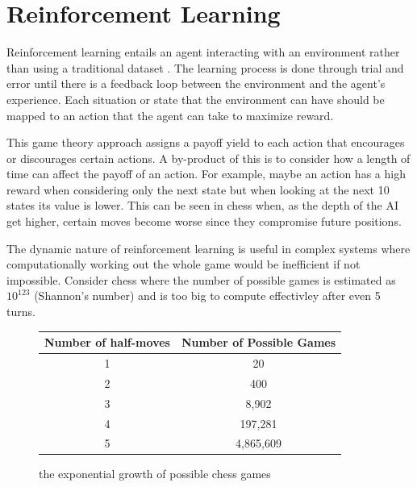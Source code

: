 \documentclass[10pt,a4paper]{report}
\begin{document}
	\chapter{Reinforcement Learning}
		Reinforcement learning entails an agent interacting with an environment rather than using a traditional dataset \autocite[p. 105]{DeepLearning}.
		The learning process is done through trial and error until there is a feedback loop between the environment and the agent's experience. Each situation
		or state that the environment can have should be mapped to an action that the agent can take to maximize reward. \par
		This game theory approach assigns a payoff yield to each action that encourages or discourages certain actions.
		A by-product of this is to consider how a length of time can affect the payoff of an action. For example, maybe an action has
		a high reward when considering only the next state but when looking at the next 10 states its value is lower. This can be seen
		in chess when, as the depth of the AI get higher, certain moves become worse since they compromise future positions. \par
		The dynamic nature of reinforcement learning is useful in complex systems where computationally working out the whole game would be inefficient if not impossible.
		Consider chess \autocite{shannon1950xxii} where the number of possible games is estimated as $10^{123}$ (Shannon's number) and is too big to compute effectivley after even 5 turns.
		\begin{figure}[h]
			\centering
			\begin{tabular}{||c c||}
				\hline
				Number of half-moves & Number of Possible Games\\ [0.5ex]
				\hline\hline
				1 & 20\\
				\hline
				2 & 400\\
				\hline
				3 & 8,902\\
				\hline
				4 & 197,281\\
				\hline
				5 & 4,865,609\\[1ex]
				\hline
			\end{tabular}
			\caption{the exponential growth of possible chess games}
			\label{fig:possible-chess-games}
		\end{figure}
\end{document}

